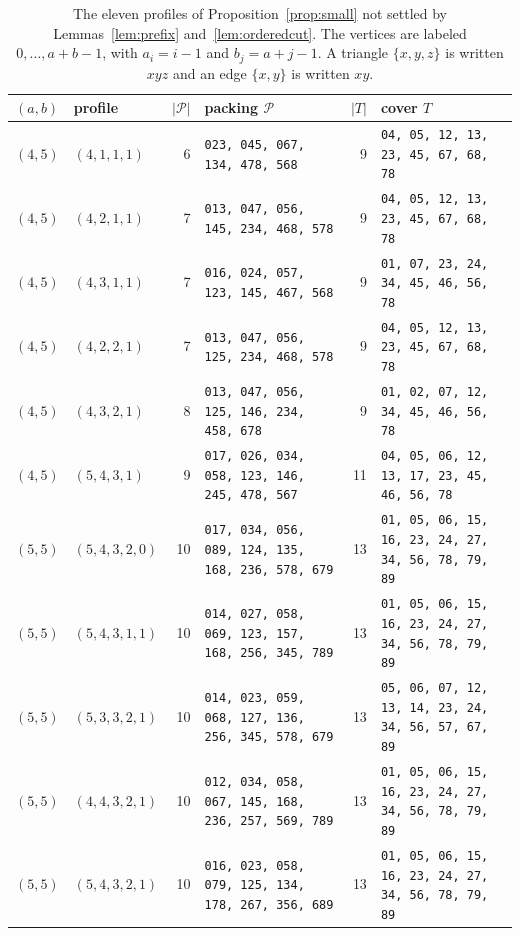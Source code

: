 \documentclass{amsart}
\theoremstyle{definition}
\theoremstyle{remark}
\numberwithin{equation}{section}
\numberwithin{table}{section}
\begin{document}
\begin{table}[t]
\caption{The eleven profiles of Proposition~\ref{prop:small} not settled by Lemmas~\ref{lem:prefix} and~\ref{lem:orderedcut}. The vertices are labeled $0,\dots,a+b-1$, with $a_i=i-1$ and $b_j=a+j-1$. A triangle $\{x,y,z\}$ is written $xyz$ and an edge $\{x,y\}$ is written $xy$.}\label{tab:small}
\footnotesize
\setlength{\tabcolsep}{4pt}
\renewcommand{\arraystretch}{1.15}
\begin{tabular}{@{}llr>{\raggedright\arraybackslash}p{4.0cm}r>{\raggedright\arraybackslash}p{4.0cm}@{}}
\toprule
$(a,b)$ & profile & $|\mathcal P|$ & packing $\mathcal P$ & $|T|$ & cover $T$\\
\midrule
$(4,5)$ & $(4,1,1,1)$ & 6 & \texttt{023, 045, 067, 134, 478, 568} & 9 & \texttt{04, 05, 12, 13, 23, 45, 67, 68, 78} \\
$(4,5)$ & $(4,2,1,1)$ & 7 & \texttt{013, 047, 056, 145, 234, 468, 578} & 9 & \texttt{04, 05, 12, 13, 23, 45, 67, 68, 78} \\
$(4,5)$ & $(4,3,1,1)$ & 7 & \texttt{016, 024, 057, 123, 145, 467, 568} & 9 & \texttt{01, 07, 23, 24, 34, 45, 46, 56, 78} \\
$(4,5)$ & $(4,2,2,1)$ & 7 & \texttt{013, 047, 056, 125, 234, 468, 578} & 9 & \texttt{04, 05, 12, 13, 23, 45, 67, 68, 78} \\
$(4,5)$ & $(4,3,2,1)$ & 8 & \texttt{013, 047, 056, 125, 146, 234, 458, 678} & 9 & \texttt{01, 02, 07, 12, 34, 45, 46, 56, 78} \\
$(4,5)$ & $(5,4,3,1)$ & 9 & \texttt{017, 026, 034, 058, 123, 146, 245, 478, 567} & 11 & \texttt{04, 05, 06, 12, 13, 17, 23, 45, 46, 56, 78} \\
$(5,5)$ & $(5,4,3,2,0)$ & 10 & \texttt{017, 034, 056, 089, 124, 135, 168, 236, 578, 679} & 13 & \texttt{01, 05, 06, 15, 16, 23, 24, 27, 34, 56, 78, 79, 89} \\
$(5,5)$ & $(5,4,3,1,1)$ & 10 & \texttt{014, 027, 058, 069, 123, 157, 168, 256, 345, 789} & 13 & \texttt{01, 05, 06, 15, 16, 23, 24, 27, 34, 56, 78, 79, 89} \\
$(5,5)$ & $(5,3,3,2,1)$ & 10 & \texttt{014, 023, 059, 068, 127, 136, 256, 345, 578, 679} & 13 & \texttt{05, 06, 07, 12, 13, 14, 23, 24, 34, 56, 57, 67, 89} \\
$(5,5)$ & $(4,4,3,2,1)$ & 10 & \texttt{012, 034, 058, 067, 145, 168, 236, 257, 569, 789} & 13 & \texttt{01, 05, 06, 15, 16, 23, 24, 27, 34, 56, 78, 79, 89} \\
$(5,5)$ & $(5,4,3,2,1)$ & 10 & \texttt{016, 023, 058, 079, 125, 134, 178, 267, 356, 689} & 13 & \texttt{01, 05, 06, 15, 16, 23, 24, 27, 34, 56, 78, 79, 89} \\
\bottomrule
\end{tabular}
\end{table}
\end{document}
